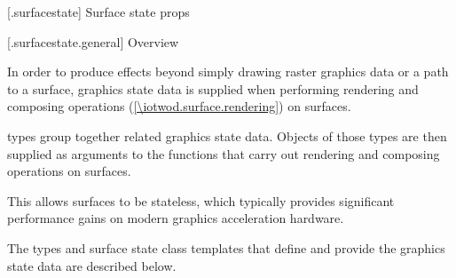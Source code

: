 
 [\iotwod.surfacestate] {Surface state props}

 [\iotwod.surfacestate.general] {Overview}

\pnum
In order to produce effects beyond simply drawing raster graphics data or a path to a surface, graphics state data is supplied when performing rendering and composing operations (\ref{\iotwod.surface.rendering}) on surfaces.

\pnum
{} types group together related graphics state data. Objects of those types are then supplied as arguments to the functions that carry out rendering and composing operations on surfaces. \begin{note}This allows surfaces to be stateless, which typically provides significant performance gains on modern graphics acceleration hardware.\end{note}

\pnum
The  types and surface state class templates that define and provide the graphics state data are described below.

\addtocounter{SectionDepthBase}{1}













\addtocounter{SectionDepthBase}{-1}
